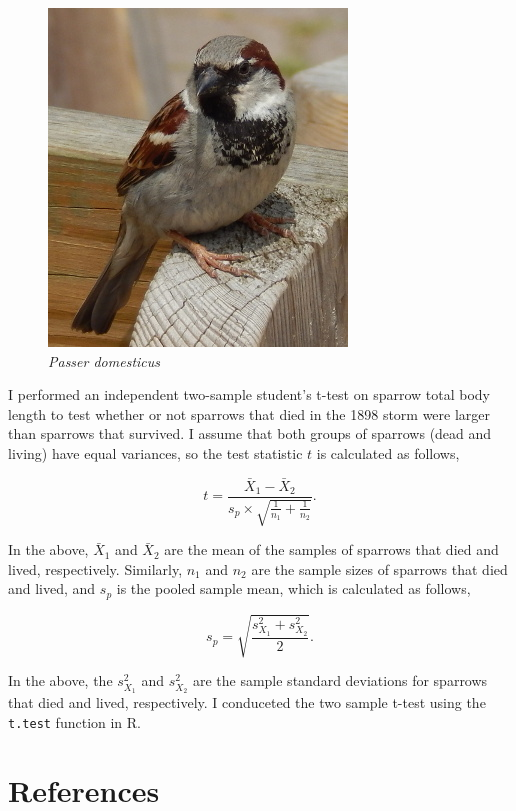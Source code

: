 \documentclass[
]{article}
\begin{document}
\begin{figure}
\centering
\includegraphics{images/sparrow.jpg}
\caption{\emph{Passer domesticus}}
\end{figure}

I performed an independent two-sample student's t-test on sparrow total body length to test whether or not sparrows that died in the 1898 storm were larger than sparrows that survived. I assume that both groups of sparrows (dead and living) have equal variances, so the test statistic \(t\) is calculated as follows,

\[t = \frac{\bar{X}_{1} - \bar{X}_{2}} {s_{p} \times \sqrt{\frac{1}{n_{1}} + \frac{1}{n_{2}}}}.\]

In the above, \(\bar{X}_{1}\) and \(\bar{X}_{2}\) are the mean of the samples of sparrows that died and lived, respectively. Similarly, \(n_{1}\) and \(n_{2}\) are the sample sizes of sparrows that died and lived, and \(s_{p}\) is the pooled sample mean, which is calculated as follows,

\[s_{p} = \sqrt{\frac{s^{2}_{X_{1}} + s^{2}_{X_{2}}}{2}}.\]

In the above, the \(s^{2}_{X_{1}}\) and \(s^{2}_{X_{2}}\) are the sample standard deviations for sparrows that died and lived, respectively. I conduceted the two sample t-test using the \texttt{t.test} function in R.

\clearpage

\hypertarget{references}{%
\section{References}\label{references}}
\end{document}
